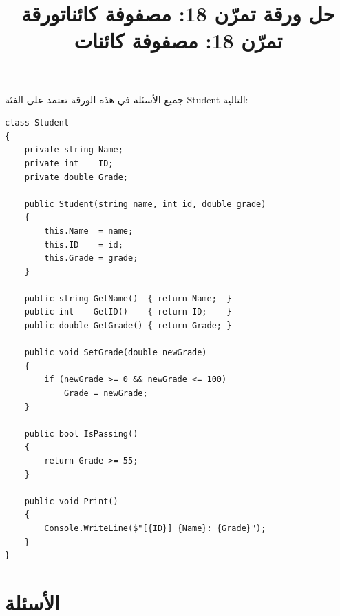 \documentclass[14pt]{extarticle}
\title{حل ورقة تمرّن 18: مصفوفة كائنات}
\title{ورقة تمرّن 18: مصفوفة كائنات}
\begin{document}
\maketitle
\thispagestyle{fancy}

جميع الأسئلة في هذه الورقة تعتمد على الفئة \textenglish{Student} التالية:

{\small
\begin{boxExample}
\begin{english}
\begin{verbatim}
class Student
{
    private string Name;
    private int    ID;
    private double Grade;

    public Student(string name, int id, double grade)
    {
        this.Name  = name;
        this.ID    = id;
        this.Grade = grade;
    }

    public string GetName()  { return Name;  }
    public int    GetID()    { return ID;    }
    public double GetGrade() { return Grade; }

    public void SetGrade(double newGrade)
    {
        if (newGrade >= 0 && newGrade <= 100)
            Grade = newGrade;
    }

    public bool IsPassing()
    {
        return Grade >= 55;
    }

    public void Print()
    {
        Console.WriteLine($"[{ID}] {Name}: {Grade}");
    }
}
\end{verbatim}
\end{english}
\end{boxExample}
}
\clearpage

\section*{الأسئلة}
\end{document}
